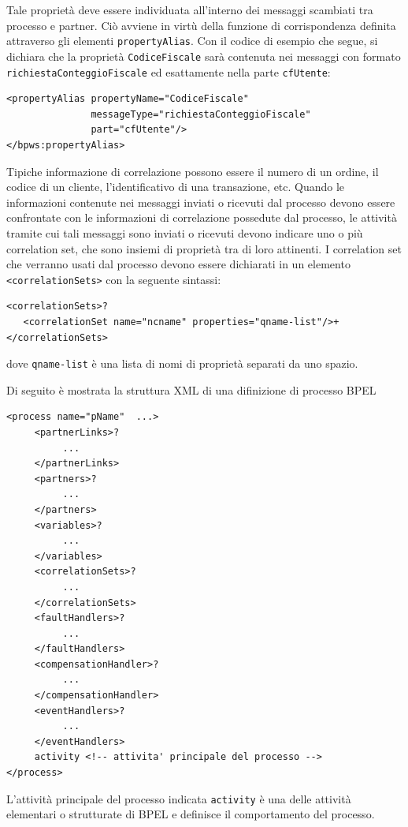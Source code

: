 Tale proprietà deve essere individuata all'interno dei messaggi scambiati tra
processo e partner. Ciò avviene in virtù della funzione di corrispondenza
definita attraverso gli elementi \texttt{propertyAlias}. Con il codice di
esempio che segue, si dichiara che la proprietà \texttt{CodiceFiscale} sarà
contenuta nei messaggi con formato \texttt{richiestaConteggioFiscale} ed
esattamente nella parte \texttt{cfUtente}:

\begin{verbatim}
<propertyAlias propertyName="CodiceFiscale"
               messageType="richiestaConteggioFiscale"
               part="cfUtente"/>
</bpws:propertyAlias>
\end{verbatim}

Tipiche informazione di correlazione possono essere il numero di un ordine,
il codice di un cliente, l'identificativo di una transazione, etc.
Quando le informazioni contenute nei messaggi inviati o ricevuti dal processo 
devono essere confrontate con le informazioni di correlazione possedute dal
processo, le attività tramite cui tali messaggi sono inviati o ricevuti devono 
indicare uno o più correlation set, che sono insiemi di proprietà tra di loro
attinenti. I correlation set che verranno usati dal processo devono essere 
dichiarati in un elemento \texttt{<correlationSets>} con la seguente sintassi:

\begin{verbatim}
<correlationSets>?
   <correlationSet name="ncname" properties="qname-list"/>+
</correlationSets>
\end{verbatim}

dove \texttt{qname-list} è una lista di nomi di proprietà separati da uno
spazio.

Di seguito è mostrata la struttura XML di una difinizione di processo BPEL
\begin{verbatim}
<process name="pName"  ...>
     <partnerLinks>?
          ...
     </partnerLinks>
     <partners>?
          ...
     </partners>
     <variables>?
          ...
     </variables>
     <correlationSets>?
          ...
     </correlationSets>
     <faultHandlers>?
          ...
     </faultHandlers>
     <compensationHandler>?
          ...
     </compensationHandler>
     <eventHandlers>?
          ...
     </eventHandlers>
     activity <!-- attivita' principale del processo -->
</process>
\end{verbatim}
L'attività principale del processo indicata \texttt{activity} è una delle
attività elementari o strutturate di BPEL e definisce il comportamento del processo.

